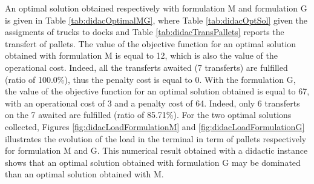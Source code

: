 \documentclass[preprint,12pt,authoryear]{elsarticle}
\begin{document}
An optimal solution obtained respectively with formulation M and formulation G is given in Table \ref{tab:didacOptimalMG}, where Table \ref{tab:didacOptSol} given the assigments of trucks to docks and Table \ref{tab:didacTransPallets} reports the transfert of pallets.
%
The value of the objective function for an optimal solution obtained with formulation M is equal to 12, which is also the value of the operational cost. Indeed, all the transferts awaited (7 transferts) are fulfilled (ratio of 100.0\%), thus the penalty cost is equal to 0.
%
With the formulation G,  the value of the objective function for an optimal solution obtained   is equal to 67, with an operational cost of 3 and a  penalty cost of 64. Indeed, only 6 transferts on the 7 awaited are fulfilled (ratio of 85.71\%).
%
For the two optimal solutions collected, Figures \ref{fig:didacLoadFormulationM} and  \ref{fig:didacLoadFormulationG}  illustrates the evolution of the load in the terminal in term of pallets respectively for formulation M and G.
%
This numerical result obtained with a didactic instance shows that an optimal  solution obtained with formulation G may be dominated than an optimal solution obtained with M.
\end{document}
